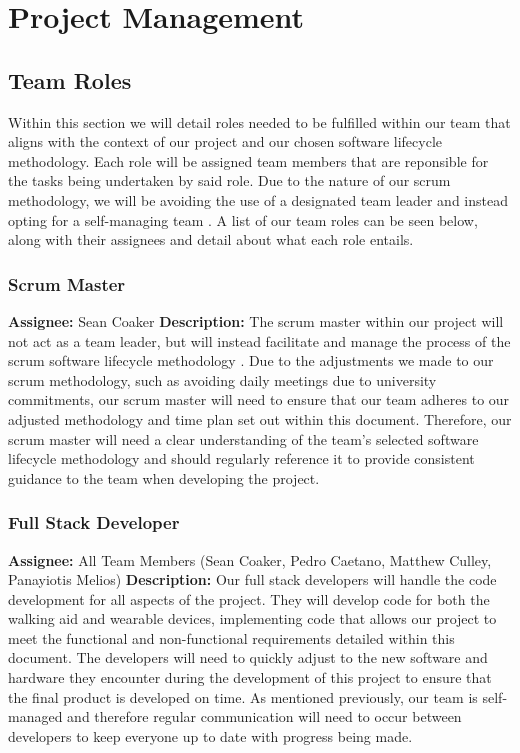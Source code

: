 \chapter{Project Management}\label{ch:schedule}

    \section{Team Roles}
        Within this section we will detail roles needed to be fulfilled within our team that aligns with the context of our project and our chosen software lifecycle methodology. Each role will be assigned team members that are reponsible for the tasks being undertaken by said role. Due to the nature of our scrum methodology, we will be avoiding the use of a designated team leader and instead opting for a self-managing team \cite{parafianowicz_2019}. A list of our team roles can be seen below, along with their assignees and detail about what each role entails.

        \subsection{Scrum Master}
            \textbf{Assignee: } Sean Coaker\newline
            \textbf{Description: } The scrum master within our project will not act as a team leader, but will instead facilitate and manage the process of the scrum software lifecycle methodology \cite{bass_2014}. Due to the adjustments we made to our scrum methodology, such as avoiding daily meetings due to university commitments, our scrum master will need to ensure that our team adheres to our adjusted methodology and time plan set out within this document. Therefore, our scrum master will need a clear understanding of the team's selected software lifecycle methodology and should regularly reference it to provide consistent guidance to the team when developing the project.

        \subsection{Full Stack Developer}
            \textbf{Assignee: } All Team Members (Sean Coaker, Pedro Caetano, Matthew Culley, Panayiotis Melios)\newline
            \textbf{Description: } Our full stack developers will handle the code development for all aspects of the project. They will develop code for both the walking aid and wearable devices, implementing code that allows our project to meet the functional and non-functional requirements detailed within this document. The developers will need to quickly adjust to the new software and hardware they encounter during the development of this project to ensure that the final product is developed on time. As mentioned previously, our team is self-managed and therefore regular communication will need to occur between developers to keep everyone up to date with progress being made.

